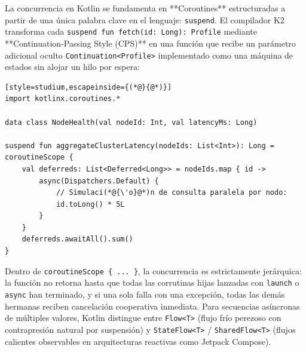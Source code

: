 \documentclass{book}
\begin{document}
La concurrencia en Kotlin se fundamenta en **Coroutines** estructuradas a partir de una única palabra clave en el lenguaje: \texttt{suspend}. El compilador K2 transforma cada \texttt{suspend fun fetch(id: Long): Profile} mediante **Continuation-Passing Style (CPS)** en una función que recibe un parámetro adicional oculto \texttt{Continuation<Profile>} implementado como una máquina de estados sin alojar un hilo por espera:
\begin{lstlisting}[style=studium,escapeinside={(*@}{@*)}]
import kotlinx.coroutines.*

data class NodeHealth(val nodeId: Int, val latencyMs: Long)

suspend fun aggregateClusterLatency(nodeIds: List<Int>): Long = coroutineScope {
    val deferreds: List<Deferred<Long>> = nodeIds.map { id ->
        async(Dispatchers.Default) {
            // Simulaci(*@{\'o}@*)n de consulta paralela por nodo:
            id.toLong() * 5L
        }
    }
    deferreds.awaitAll().sum()
}
\end{lstlisting}
Dentro de \texttt{coroutineScope \{ ... \}}, la concurrencia es estrictamente jerárquica: la función no retorna hasta que todas las corrutinas hijas lanzadas con \texttt{launch} o \texttt{async} han terminado, y si una sola falla con una excepción, todas las demás hermanas reciben cancelación cooperativa inmediata. Para secuencias asíncronas de múltiples valores, Kotlin distingue entre \texttt{Flow<T>} (flujo frío perezoso con contrapresión natural por suspensión) y \texttt{StateFlow<T>} / \texttt{SharedFlow<T>} (flujos calientes observables en arquitecturas reactivas como Jetpack Compose).
\end{document}
